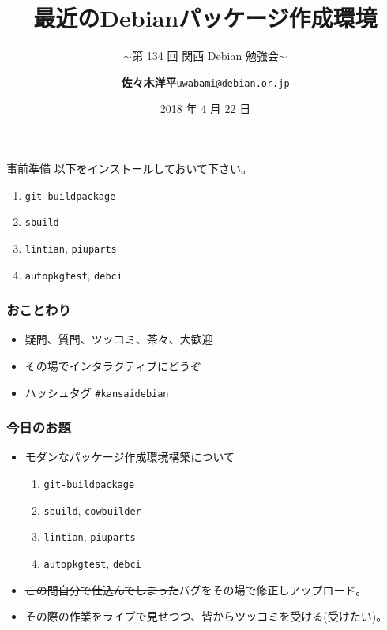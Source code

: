 \documentclass[cjk,dvipdfmx,14pt,compress,%
hyperref={bookmarks=true,bookmarksnumbered=true,bookmarksopen=false,%
colorlinks=false,%
pdftitle={第 134 回 関西 Debian 勉強会},%
pdfauthor={佐々木洋平},%
pdfsubject={資料},%
}]{beamer}
\title{最近のDebianパッケージ作成環境}
\subtitle{$\sim$第 134 回 関西 Debian 勉強会$\sim$}
\author[佐々木洋平]{{\large\textbf{佐々木洋平}}\newline\texttt{uwabami@debian.or.jp}}
\institute[Debian JP]{{\normalsize\texttt{関西 Debian 勉強会}}}
\date{{\small{2018 年 4 月 22 日}}}
\begin{document}
\begin{frame}{事前準備}
  以下をインストールしておいて下さい。
  \begin{enumerate}
  \item \texttt{git-buildpackage}
  \item \texttt{sbuild}
  \item \texttt{lintian}, \texttt{piuparts}
  \item \texttt{autopkgtest}, \texttt{debci}
  \end{enumerate}
\end{frame}

\begin{frame}
  \titlepage
\end{frame}

\begin{frame}[fragile]
  \frametitle{おことわり}
  \begin{itemize}
  \item 疑問、質問、ツッコミ、茶々、\alert{大歓迎}
  \item その場でインタラクティブにどうぞ
  \item ハッシュタグ \texttt{\#kansaidebian}
  \end{itemize}
\end{frame}


\begin{frame}[fragile]
  \frametitle{今日のお題}
  \begin{itemize}
  \item モダンなパッケージ作成環境構築について
    \begin{enumerate}
    \item \texttt{git-buildpackage}
    \item \texttt{sbuild}, \texttt{cowbuilder}
    \item \texttt{lintian}, \texttt{piuparts}
    \item \texttt{autopkgtest}, \texttt{debci}
    \end{enumerate}
  \item \sout{この間自分で仕込んでしまった}バグをその場で修正しアップロード。
  \item その際の作業をライブで見せつつ、皆からツッコミを受ける(受けたい)。
  \end{itemize}
\end{frame}
\end{document}
